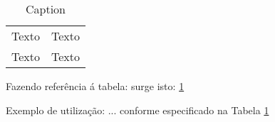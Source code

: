 \documentclass{report}
\begin{document}
\listoftables

\newpage

\begin{table}
\begin{tabular}{|c|c|}
\hline
Texto & Texto \\
Texto & Texto \\
\hline
\end{tabular}
\caption{Caption}
\label{tab:exemplo}
\end{table}


Fazendo referência á tabela: surge isto: \ref{tab:exemplo}

Exemplo de utilização:
... conforme especificado na Tabela \ref{tab:exemplo}
\end{document}
